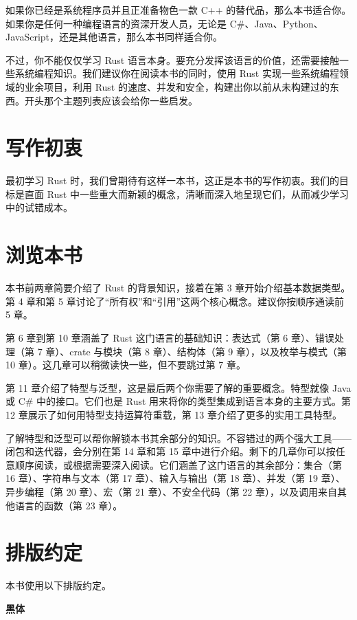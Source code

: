 如果你已经是系统程序员并且正准备物色一款 C++ 的替代品，那么本书适合你。如果你是任何一种编程语言的资深开发人员，无论是 C\#、Java、Python、JavaScript，还是其他语言，那么本书同样适合你。

不过，你不能仅仅学习 Rust 语言本身。要充分发挥该语言的价值，还需要接触一些系统编程知识。我们建议你在阅读本书的同时，使用 Rust 实现一些系统编程领域的业余项目，利用 Rust 的速度、并发和安全，构建出你以前从未构建过的东西。开头那个主题列表应该会给你一些启发。

\section{写作初衷}

最初学习 Rust 时，我们曾期待有这样一本书，这正是本书的写作初衷。我们的目标是直面 Rust 中一些重大而新颖的概念，清晰而深入地呈现它们，从而减少学习中的试错成本。

\section{浏览本书}

本书前两章简要介绍了 Rust 的背景知识，接着在第 3 章开始介绍基本数据类型。第 4 章和第 5 章讨论了“所有权”和“引用”这两个核心概念。建议你按顺序通读前 5 章。

第 6 章到第 10 章涵盖了 Rust 这门语言的基础知识：表达式（第 6 章）、错误处理（第 7 章）、crate 与模块（第 8 章）、结构体（第 9 章），以及枚举与模式（第 10 章）。这几章可以稍微读快一些，但不要跳过第 7 章。

第 11 章介绍了特型与泛型，这是最后两个你需要了解的重要概念。特型就像 Java 或 C\# 中的接口。它们也是 Rust 用来将你的类型集成到语言本身的主要方式。第 12 章展示了如何用特型支持运算符重载，第 13 章介绍了更多的实用工具特型。

了解特型和泛型可以帮你解锁本书其余部分的知识。不容错过的两个强大工具——闭包和迭代器，会分别在第 14 章和第 15 章中进行介绍。剩下的几章你可以按任意顺序阅读，或根据需要深入阅读。它们涵盖了这门语言的其余部分：集合（第 16 章）、字符串与文本（第 17 章）、输入与输出（第 18 章）、并发（第 19 章）、异步编程（第 20 章）、宏（第 21 章）、不安全代码（第 22 章），以及调用来自其他语言的函数（第 23 章）。

\section{排版约定}

本书使用以下排版约定。

\textbf{黑体}

